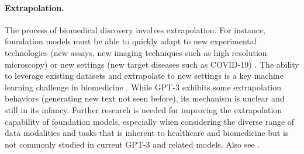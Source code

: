 \paragraph{Extrapolation.}
The process of biomedical discovery involves extrapolation. For instance, foundation models must be able to quickly adapt to new experimental technologies (\eg new assays, new imaging techniques such as high resolution microscopy) or new settings (\eg new target diseases such as COVID-19) \citep{jaroch2018cell,benam2019exploring}. The ability to leverage existing datasets and extrapolate to new settings is a key machine learning challenge in biomedicine \cite{snell2017prototypical, ma2021few}. 
While GPT-3 exhibits some extrapolation behaviors (\eg generating new text not seen before), its mechanism is unclear and still in its infancy. Further research is needed for improving the extrapolation capability of foundation models, especially when considering the diverse range of data modalities and tasks that is inherent to healthcare and biomedicine but is not commonly studied in current GPT-3 and related models. Also see . 

